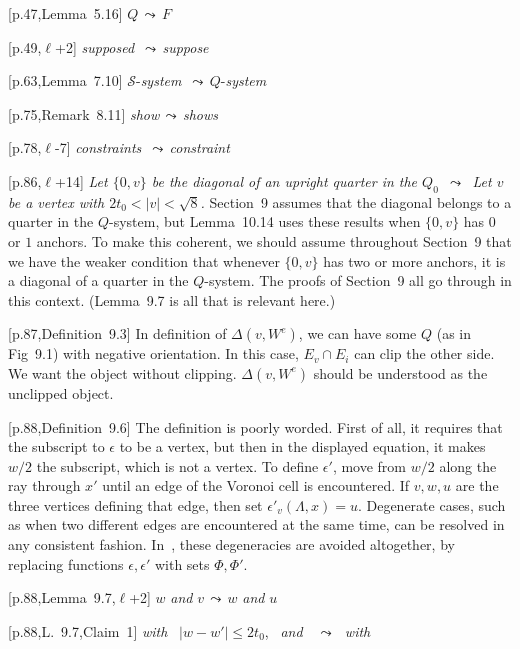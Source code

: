 \documentclass[11pt]{amsart}
\def\lto{\ensuremath{\,\leadsto\,}}
\def\line{$\ell$}
\def\text{\hbox}
\def\sz{small} %
\def\rmx{\rm}
\begin{document}
\begin{\sz}
\baselineskip

[p.47,Lemma~5.16] $Q\lto F$

[p.49,\line+2] {\it supposed} \lto {\it suppose}
	
[p.63,Lemma~7.10]
	${\mathcal S}$-{\it system} \lto $Q$-{\it system}
	

[p.75,Remark~8.11]
	{\it show}\lto {\it shows}

[p.78,\line-7] {\it constraints} \lto{\it  constraint}

[p.86,\line+14] {\it Let $\{0,v\}$ be 
          the diagonal of an upright quarter in the $Q_0$
        \lto
       Let $v$ be a vertex with $2t_0<|v|<\sqrt8$.}
           {\rmx Section~9 assumes that the diagonal belongs to
          a quarter in the $Q$-system, but Lemma~10.14 uses these
          results when $\{0,v\}$ has $0$ or $1$ anchors.  To make
          this coherent, we should assume throughout Section~9 that
          we have the weaker condition that whenever $\{0,v\}$ has
          two or more anchors, it is a diagonal of a quarter in the $Q$-system.
          The proofs of Section~9 all go through in this context.
           (Lemma~9.7 is all that is relevant here.)}

[p.87,Definition~9.3]
	{\rmx In definition of $\Delta(v,W^e)$, we
	can have some $Q$ (as in Fig~9.1)
	with negative orientation.
	In this case, $E_v\cap E_i$ can clip
	the other side.  We want the object
	without clipping.   $\Delta(v,W^e)$ should be understood as the
        unclipped object.}
	
[p.88,Definition~9.6]
	{\rmx The definition is poorly worded.  First of
	all, it requires that the subscript to
	$\epsilon$ to be a vertex, but then in
	the displayed equation, it makes $w/2$ the
	subscript, which is not a vertex.   To
	define $\epsilon'$, move from $w/2$ along
	the ray through $x'$ until an edge of the
	Voronoi cell is encountered.  If $v,w,u$
	are the three vertices defining that edge,
	then set $\epsilon'_v(\Lambda,x)=u$.
	Degenerate cases, such as when two different
	edges are encountered at the same time,
	can be resolved in any consistent fashion.  In~\cite{hales:2008:collection},
      these degeneracies are avoided altogether, by replacing functions 
      $\epsilon,\epsilon'$ with sets $\Phi,\Phi'$.
     }
	
[p.88,Lemma~9.7,\line+2] 
	$w$ {\it  and}  $v$\lto $w$ {\it and}  $u$

	
[p.88,L.~9.7,Claim~1]
	\text{{\it  with }} $|w - w'|\le 2t_0$, \text{ {\it and} }
	\lto \text{ {\it with} }


\end{\sz}
\end{document}

